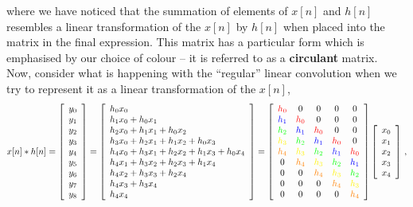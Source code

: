 %
where we have noticed that the summation of elements of $x[n]$ and $h[n]$
resembles a linear transformation of the $x[n]$ by $h[n]$ when placed into
the matrix in the final expression. This matrix has a particular form which
is emphasised by our choice of colour -- it is referred to as a \textbf{circulant}
matrix.\\
%
Now, consider what is happening with the ``regular'' linear convolution when we
try to represent it as a linear transformation of the $x[n]$,
%
\begin{displaymath}
  x[n] * h[n] =
  \left[\begin{array}{c}
      y_0 \\ y_1 \\ y_2 \\ y_3 \\ y_4 \\ y_5 \\ y_6 \\ y_7 \\ y_8
    \end{array}\right] =
  \left[\begin{array}{l}
      h_0x_0 \\
      h_1x_0 + h_0x_1 \\
      h_2x_0 + h_1x_1 + h_0x_2 \\
      h_3x_0 + h_2x_1 + h_1x_2 + h_0x_3 \\
      h_4x_0 + h_3x_1 + h_2x_2 + h_1x_3 + h_0x_4 \\
      h_4x_1 + h_3x_2 + h_2x_3 + h_1x_4 \\
      h_4x_2 + h_3x_3 + h_2x_4 \\
      h_4x_3 + h_3x_4 \\
      h_4x_4
    \end{array}\right]
  = \left[\begin{array}{ccccc}
      \red{h_0} & 0 & 0 & 0 & 0 \\
      \blu{h_1} & \red{h_0} & 0 & 0 & 0 \\
      \grn{h_2} & \blu{h_1} & \red{h_0} & 0 & 0 \\
      \yel{h_3} & \grn{h_2} & \blu{h_1} & \red{h_0} & 0 \\
      \orn{h_4} & \yel{h_3} & \grn{h_2} & \blu{h_1} & \red{h_0} \\
      0 & \orn{h_4} & \yel{h_3} & \grn{h_2} & \blu{h_1} \\
      0 & 0 & \orn{h_4} & \yel{h_3} & \grn{h_2} \\
      0 & 0 & 0 & \orn{h_4} & \yel{h_3} \\
      0 & 0 & 0 & 0 &\orn{h_4}
    \end{array}\right] \left[\begin{array}{c}
      x_0 \\ x_1 \\ x_2 \\ x_3 \\ x_4
    \end{array}\right] \,,
\end{displaymath}
